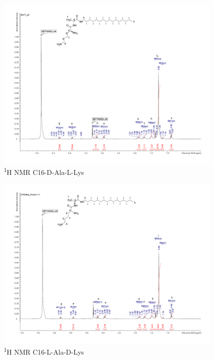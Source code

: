 \begin{figure}[ht!]
\centering
\includegraphics[scale=0.47]{NMR/KAT1_22.pdf}
\caption{\textsuperscript{1}H NMR C16-D-Ala-L-Lys}
\label{KAT1.22_NMR2}
\end{figure}

\begin{figure}[ht!]
\centering
\includegraphics[scale=0.47]{NMR/KAT1_30.pdf}
\caption{\textsuperscript{1}H NMR C16-L-Ala-D-Lys}
\label{KAT1.30_NMR2}
\end{figure}

